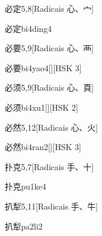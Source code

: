 \begin{entry}{必定}{5,8}[Radicais ⼼、⼧]
  \begin{phonetics}{必定}{bi4ding4}
  \end{phonetics}
\end{entry}

\begin{entry}{必要}{5,9}[Radicais ⼼、⾑]
  \begin{phonetics}{必要}{bi4yao4}[][HSK 3]
  \end{phonetics}
\end{entry}

\begin{entry}{必须}{5,9}[Radicais ⼼、⾴]
  \begin{phonetics}{必须}{bi4xu1}[][HSK 2]
  \end{phonetics}
\end{entry}

\begin{entry}{必然}{5,12}[Radicais ⼼、⽕]
  \begin{phonetics}{必然}{bi4ran2}[][HSK 3]
  \end{phonetics}
\end{entry}

\begin{entry}{扑克}{5,7}[Radicais ⼿、⼗]
  \begin{phonetics}{扑克}{pu1ke4}
  \end{phonetics}
\end{entry}

\begin{entry}{扒犁}{5,11}[Radicais ⼿、⽜]
  \begin{phonetics}{扒犁}{pa2li2}
  \end{phonetics}
\end{entry}

